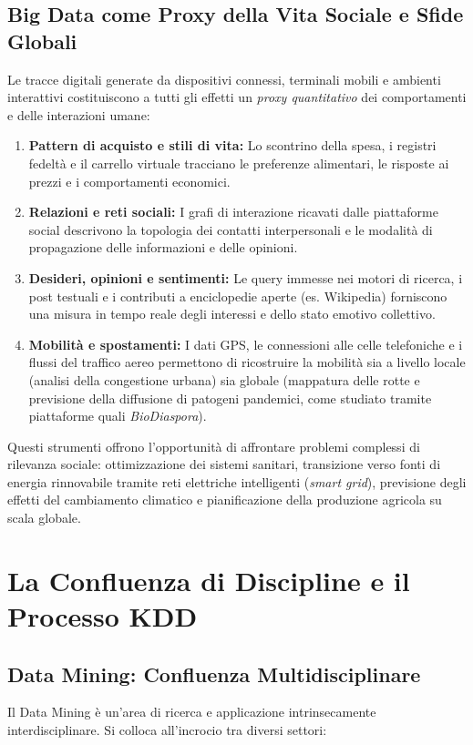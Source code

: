 \FloatBarrier
\subsection{Big Data come Proxy della Vita Sociale e Sfide Globali}
Le tracce digitali generate da dispositivi connessi, terminali mobili e ambienti interattivi costituiscono a tutti gli effetti un \textit{proxy quantitativo} dei comportamenti e delle interazioni umane:

\begin{enumerate}
    \item \textbf{Pattern di acquisto e stili di vita:} Lo scontrino della spesa, i registri fedelt\`a e il carrello virtuale tracciano le preferenze alimentari, le risposte ai prezzi e i comportamenti economici.
    \item \textbf{Relazioni e reti sociali:} I grafi di interazione ricavati dalle piattaforme social descrivono la topologia dei contatti interpersonali e le modalit\`a di propagazione delle informazioni e delle opinioni.
    \item \textbf{Desideri, opinioni e sentimenti:} Le query immesse nei motori di ricerca, i post testuali e i contributi a enciclopedie aperte (es. Wikipedia) forniscono una misura in tempo reale degli interessi e dello stato emotivo collettivo.
    \item \textbf{Mobilit\`a e spostamenti:} I dati GPS, le connessioni alle celle telefoniche e i flussi del traffico aereo permettono di ricostruire la mobilit\`a sia a livello locale (analisi della congestione urbana) sia globale (mappatura delle rotte e previsione della diffusione di patogeni pandemici, come studiato tramite piattaforme quali \textit{BioDiaspora}).
\end{enumerate}

Questi strumenti offrono l'opportunit\`a di affrontare problemi complessi di rilevanza sociale: ottimizzazione dei sistemi sanitari, transizione verso fonti di energia rinnovabile tramite reti elettriche intelligenti (\textit{smart grid}), previsione degli effetti del cambiamento climatico e pianificazione della produzione agricola su scala globale.

\FloatBarrier
\section{La Confluenza di Discipline e il Processo KDD}

\FloatBarrier
\subsection{Data Mining: Confluenza Multidisciplinare}
Il Data Mining \`e un'area di ricerca e applicazione intrinsecamente interdisciplinare. Si colloca all'incrocio tra diversi settori:

